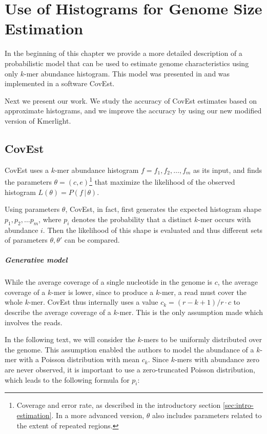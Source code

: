 \chapter{Use of Histograms for Genome Size Estimation}
\label{sec:chapter3}
In the beginning of this chapter we provide a more detailed description of a probabilistic model
that can be used to estimate genome characteristics using only $k$-mer abundance histogram.
This model was presented in \cite{Hozza2015, Hozza2016} and was implemented in a software CovEst.

Next we present our work. We study the accuracy of CovEst estimates based on
approximate histograms, and we improve the accuracy by using our new modified version of Kmerlight.

\section{CovEst}
\label{sec:covest}
CovEst uses a $k$-mer abundance histogram $f = f_1, f_2, \dots, f_m$ as its input,
and finds the parameters $\theta = (c, e)$\footnote{Coverage and error rate, as described 
in the introductory section \ref{sec:intro-estimation}. In a more advanced version, $\theta$
also includes parameters related to the extent of repeated regions.} that maximize
the likelihood of the observed histogram $L(\theta) = P(f \,|\, \theta)$.

Using parameters $\theta$, CovEst, in fact, first generates the expected histogram
shape $p_1, p_2, \dots p_m$, where $p_i$ denotes the probability that a distinct $k$-mer
occurs with abundance $i$. Then the likelihood of this shape is evaluated and thus 
different sets of parameters $\theta, \theta'$ can be compared.

\paragraph{Generative model}
While the average coverage of a single nucleotide in the genome is $c$, the average coverage
of a $k$-mer is lower, since to produce a $k$-mer, a read must cover the whole
$k$-mer. CovEst thus internally uses a value $c_k = (r-k+1)/r \cdot c$ to describe the
average coverage of a $k$-mer. This is the only assumption made which involves the reads.

In the following text, we will consider the $k$-mers to be uniformly distributed
over the genome. This assumption enabled the authors to model the abundance of a $k$-mer
with a Poisson distribution with mean $c_k$. Since $k$-mers with abundance zero are never
observed, it is important to use a zero-truncated Poisson distribution, 
which leads to the following formula for $p_i$:

